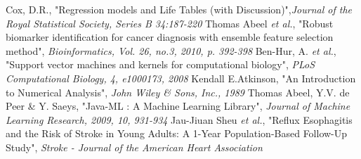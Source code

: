 \documentclass{ba-kecs}
\numberwithin{figure}{section}
\numberwithin{equation}{section}
\begin{document}
\begin{thebibliography}{99}
 Cox, D.R., "Regression models and Life Tables (with Discussion)",\emph{Journal of the Royal Statistical Society, Series B 34:187-220}
 Thomas Abeel \emph{et al.}, "Robust biomarker identification for cancer diagnosis with ensemble feature selection method", \emph{Bioinformatics, Vol. 26, no.3, 2010, p. 392-398}
 Ben-Hur, A. \emph{et al.}, "Support vector machines and kernels for computational biology", \emph{PLoS Computational Biology, 4, e1000173, 2008}
 Kendall E.Atkinson, "An Introduction to Numerical Analysis", \emph{John Wiley \& Sons, Inc., 1989}
 Thomas Abeel, Y.V. de Peer \& Y. Saeys, "Java-ML : A Machine Learning Library", \emph{Journal of Machine Learning Research, 2009, 10, 931-934}
 Jau-Jiuan Sheu \emph{et al.}, "Reflux Esophagitis and the Risk of Stroke in Young Adults: A 1-Year Population-Based Follow-Up Study", \emph{Stroke - Journal of the American Heart Association}
\end{thebibliography}
\end{document}
